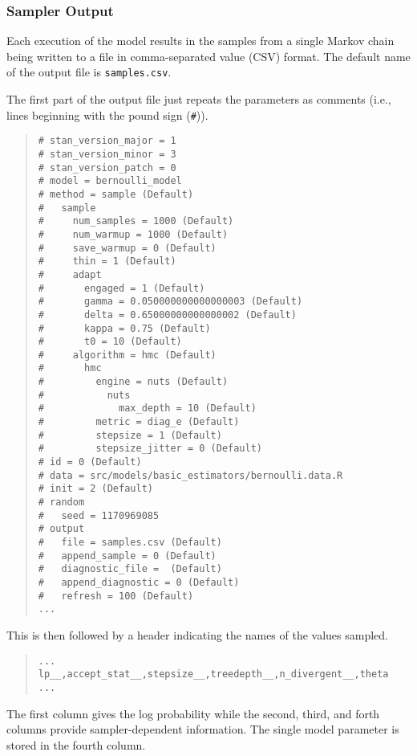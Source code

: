 \subsubsection{Sampler Output}

Each execution of the model results in the samples from a single
Markov chain being written to a file in comma-separated value (CSV) format.
The default name of the output file is \nolinkurl{samples.csv}.

The first part of the output file just repeats the parameters
as comments (i.e., lines beginning with the pound sign (\Verb|#|)).
%
\begin{quote}
\begin{Verbatim}[fontsize=\small]
# stan_version_major = 1
# stan_version_minor = 3
# stan_version_patch = 0
# model = bernoulli_model
# method = sample (Default)
#   sample
#     num_samples = 1000 (Default)
#     num_warmup = 1000 (Default)
#     save_warmup = 0 (Default)
#     thin = 1 (Default)
#     adapt
#       engaged = 1 (Default)
#       gamma = 0.050000000000000003 (Default)
#       delta = 0.65000000000000002 (Default)
#       kappa = 0.75 (Default)
#       t0 = 10 (Default)
#     algorithm = hmc (Default)
#       hmc
#         engine = nuts (Default)
#           nuts
#             max_depth = 10 (Default)
#         metric = diag_e (Default)
#         stepsize = 1 (Default)
#         stepsize_jitter = 0 (Default)
# id = 0 (Default)
# data = src/models/basic_estimators/bernoulli.data.R
# init = 2 (Default)
# random
#   seed = 1170969085
# output
#   file = samples.csv (Default)
#   append_sample = 0 (Default)
#   diagnostic_file =  (Default)
#   append_diagnostic = 0 (Default)
#   refresh = 100 (Default)
...
\end{Verbatim}
\end{quote}
%
This is then followed by a header indicating the
names of the values sampled.
%
\begin{quote}
\begin{Verbatim}[fontsize=\small]
...
lp__,accept_stat__,stepsize__,treedepth__,n_divergent__,theta
...
\end{Verbatim}
\end{quote}
%
The first column gives the log probability while the second, third,
and forth columns provide sampler-dependent information.
The single model parameter  is stored in the fourth column.

